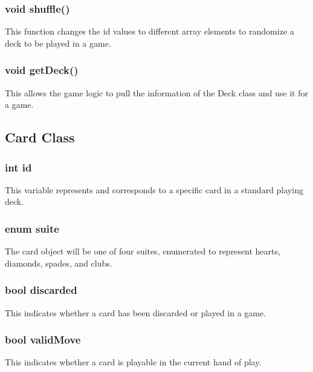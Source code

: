 \subsubsection
        {
          void shuffle()
        }
        This function changes the id values to different array elements to
          randomize a deck to be played in a game.
\subsubsection
        {
          void getDeck()
        }
        This allows the game logic to pull the information of the Deck class and use it for a game.
\subsection
        {
          Card Class
        }

        \subsubsection
        {
          int id
        }
        This variable represents and corresponds to a specific card in a
          standard playing deck.
\subsubsection
        {
          enum suite
        }
        The card object will be one of four suites,
          enumerated to represent hearts, diamonds, spades, and clubs.
\subsubsection
        {
          bool discarded
        }
        This indicates whether a card has been discarded or played in a game.
\subsubsection
        {
          bool validMove
        }
        This indicates whether a card is playable in the current hand of play.
